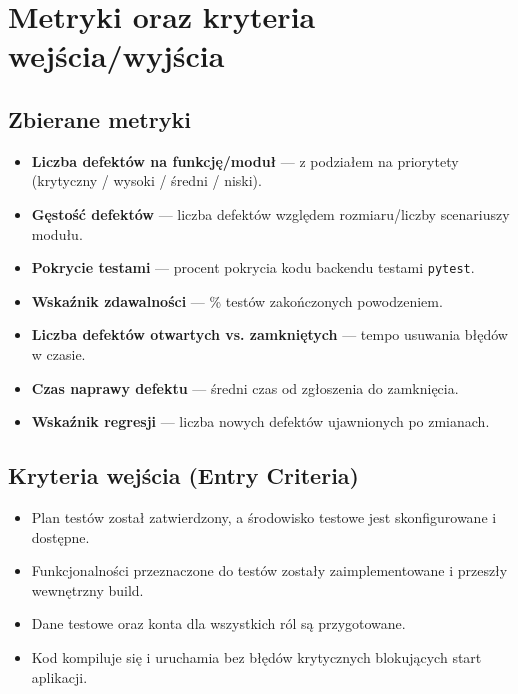 \documentclass[11pt,a4paper]{article}
\begin{document}
\section{Metryki oraz kryteria wejścia/wyjścia}

\subsection{Zbierane metryki}
\begin{itemize}
  \item \textbf{Liczba defektów na funkcję/moduł} — z podziałem na priorytety (krytyczny / wysoki / średni / niski).
  \item \textbf{Gęstość defektów} — liczba defektów względem rozmiaru/liczby scenariuszy modułu.
  \item \textbf{Pokrycie testami} — procent pokrycia kodu backendu testami \texttt{pytest}.
  \item \textbf{Wskaźnik zdawalności} — \% testów zakończonych powodzeniem.
  \item \textbf{Liczba defektów otwartych vs. zamkniętych} — tempo usuwania błędów w czasie.
  \item \textbf{Czas naprawy defektu} — średni czas od zgłoszenia do zamknięcia.
  \item \textbf{Wskaźnik regresji} — liczba nowych defektów ujawnionych po zmianach.
\end{itemize}

\subsection{Kryteria wejścia (Entry Criteria)}
\begin{itemize}
  \item Plan testów został zatwierdzony, a środowisko testowe jest skonfigurowane i dostępne.
  \item Funkcjonalności przeznaczone do testów zostały zaimplementowane i przeszły wewnętrzny build.
  \item Dane testowe oraz konta dla wszystkich ról są przygotowane.
  \item Kod kompiluje się i uruchamia bez błędów krytycznych blokujących start aplikacji.
\end{itemize}
\end{document}
